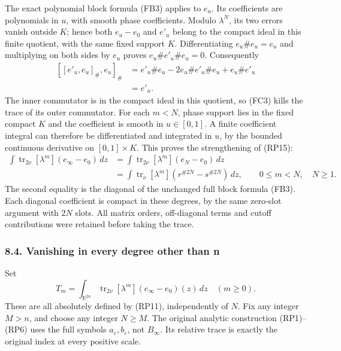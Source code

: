 \documentclass[
  11pt,
]{article}
\begin{document}
The exact polynomial block formula (FB3) applies to \(e_u\). Its
coefficients are polynomials in \(u\), with smooth phase coefficients.
Modulo \(\lambda^N\), its two errors vanish outside \(K\); hence both
\(e_u-e_0\) and \(e'_u\) belong to the compact ideal in this finite
quotient, with the same fixed support \(K\). Differentiating
\(e_u\#e_u=e_u\) and multiplying on both sides by \(e_u\) proves
\(e_u\#e'_u\#e_u=0\). Consequently \[
 \begin{aligned}
 [[e'_u,e_u]_\#,e_u]_\#
 &=e'_u\#e_u-2e_u\#e'_u\#e_u+e_u\#e'_u\\
 &=e'_u.
 \end{aligned}
 \tag{FC4}
\] The inner commutator is in the compact ideal in this quotient, so
(FC3) kills the trace of its outer commutator. For each \(m<N\), phase
support lies in the fixed compact \(K\) and the coefficient is smooth in
\(u\in[0,1]\). A finite coefficient integral can therefore be
differentiated and integrated in \(u\), by the bounded continuous
derivative on \([0,1]\times K\). This proves the strengthening of
(RP15): \[
 \begin{aligned}
 \int\operatorname{tr}_{2\nu}[\lambda^m](e_\infty-e_0)\,dz
 &=\int\operatorname{tr}_{2\nu}[\lambda^m](e_N-e_0)\,dz\\
 &=\int\operatorname{tr}_{\nu}[\lambda^m]
           (r^{\#2N}-s^{\#2N})\,dz,
 \qquad 0\le m<N,\quad N\ge1.
 \end{aligned}
 \tag{FC5}
\] The second equality is the diagonal of the unchanged full block
formula (FB3). Each diagonal coefficient is compact in these degrees, by
the same zero-slot argument with \(2N\) slots. All matrix orders,
off-diagonal terms and cutoff contributions were retained before taking
the trace.

\subsubsection{8.4. Vanishing in every degree other than
n}\label{vanishing-in-every-degree-other-than-n}

Set \[
 T_m=\int_{\mathbb R^{2n}}
           \operatorname{tr}_{2\nu}[\lambda^m]
                      (e_\infty-e_0)(z)\,dz\quad(m\ge0).
 \tag{FC6}
\] These are all absolutely defined by (RP11), independently of \(N\).
Fix any integer \(M>n\), and choose any integer \(N\ge M\). The original
analytic construction (RP1)--(RP6) uses the full symbols
\(a_\varepsilon,b_\varepsilon\), not \(B_\infty\). Its relative trace is
exactly the original index at every positive scale.
\end{document}
